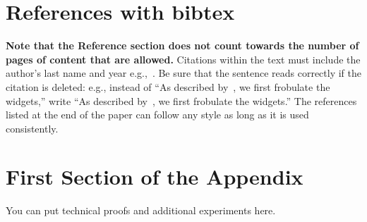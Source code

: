 \documentclass{article}
\begin{document}











\section*{References with bibtex}
{\bf Note that the Reference section does not count towards the number of pages of content that are allowed.}
Citations within the text must include the author's last name and year e.g.,~\citep{MachineLearningI}. Be sure that the sentence reads correctly if the citation is deleted: e.g., instead of “As described by~\citep{DudaHart2nd}, we first frobulate the widgets,” write “As described by~\citet{DudaHart2nd}, we first frobulate the widgets.” The references listed at the end of the paper can follow any style as long as it is used consistently.





\appendix 
\section{First Section of the Appendix}
You can put technical proofs and additional experiments here.
\end{document}
